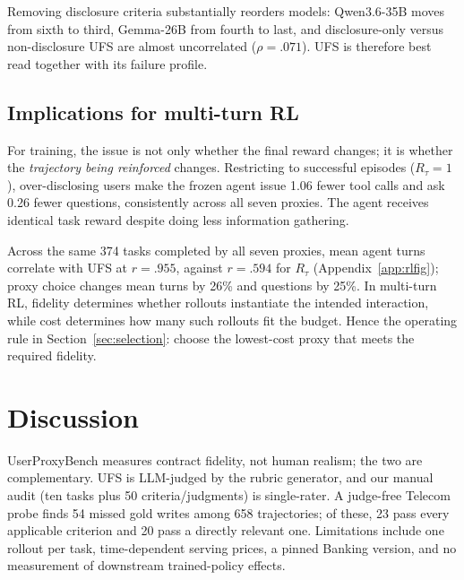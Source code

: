\documentclass{article}
\begin{document}
Removing disclosure criteria substantially reorders models: Qwen3.6-35B moves from sixth to third, Gemma-26B from fourth to last, and disclosure-only versus non-disclosure UFS are almost uncorrelated ($\rho=.071$). UFS is therefore best read together with its failure profile.

\subsection{Implications for multi-turn RL}
For training, the issue is not only whether the final reward changes; it is whether the \emph{trajectory being reinforced} changes. Restricting to successful episodes ($R_{\tau}=1$), over-disclosing users make the frozen agent issue 1.06 fewer tool calls and ask 0.26 fewer questions, consistently across all seven proxies. The agent receives identical task reward despite doing less information gathering.

Across the same 374 tasks completed by all seven proxies, mean agent turns correlate with UFS at $r=.955$, against $r=.594$ for $R_{\tau}$ (Appendix~\ref{app:rlfig}); proxy choice changes mean turns by 26\% and questions by 25\%. In multi-turn RL, fidelity determines whether rollouts instantiate the intended interaction, while cost determines how many such rollouts fit the budget. Hence the operating rule in Section~\ref{sec:selection}: choose the lowest-cost proxy that meets the required fidelity.

\section{Discussion}
\label{sec:discussion}
UserProxyBench measures contract fidelity, not human realism; the two are complementary. UFS is LLM-judged by the rubric generator, and our manual audit (ten tasks plus 50 criteria/judgments) is single-rater. A judge-free Telecom probe finds 54 missed gold writes among 658 trajectories; of these, 23 pass every applicable criterion and 20 pass a directly relevant one. Limitations include one rollout per task, time-dependent serving prices, a pinned Banking version, and no measurement of downstream trained-policy effects.
\end{document}
